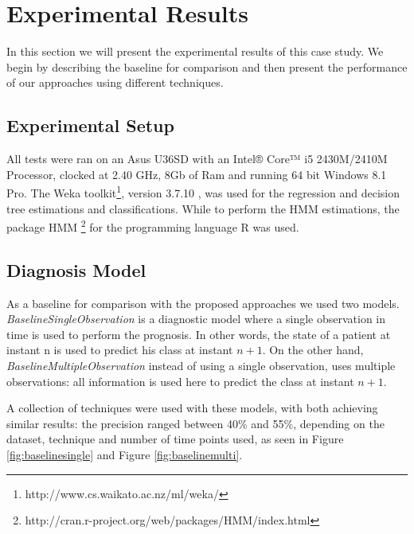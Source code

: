 \section{Experimental Results}
\label{section:results}

In this section we will present the experimental results of this case study. We begin by describing the baseline for comparison and then present the performance of our approaches using different techniques.

\subsection{Experimental Setup}
\label{subsection:setup}

All tests were ran on an Asus U36SD with an Intel® Core™ i5 2430M/2410M Processor, clocked at 2.40 GHz, 8Gb of Ram and running 64 bit Windows 8.1 Pro.
The Weka toolkit\footnote{http://www.cs.waikato.ac.nz/ml/weka/}, version 3.7.10 , was used for the regression and decision tree estimations and classifications. While to perform the HMM estimations, the package HMM \footnote{http://cran.r-project.org/web/packages/HMM/index.html} for the programming language R was used.

\subsection{Diagnosis Model}
\label{subsection:diagnosis}

As a baseline for comparison with the proposed approaches we used two models. \emph{BaselineSingleObservation} is a diagnostic model
 where a single observation in time is used to perform the prognosis. In other words, the state of a patient at instant n is
 used to predict his class at instant $n+1$. On the other hand, \emph{BaselineMultipleObservation} instead of using a single observation,
 uses multiple observations: all information is used here to predict the class at instant $n+1$.

A collection of techniques were used with these models, with both achieving similar results: the precision ranged between 40\% and 55\%,
 depending on the dataset, technique and number of time points used, as seen in Figure \ref{fig:baselinesingle} and Figure \ref{fig:baselinemulti}.
 
